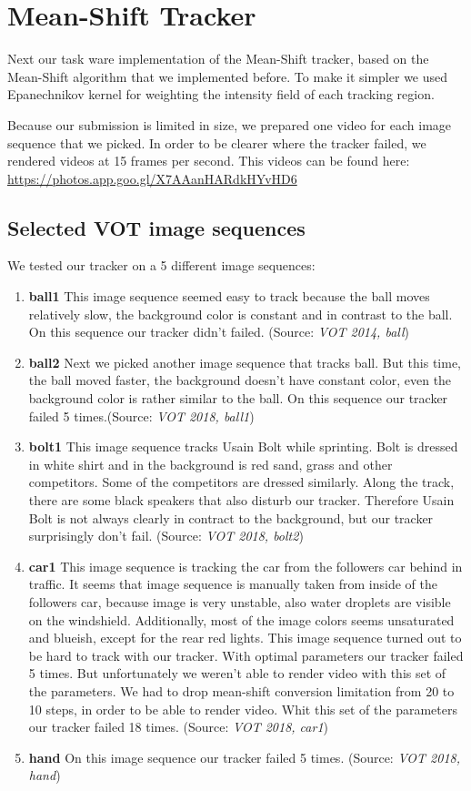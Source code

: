 \documentclass[runningheads]{llncs}
\begin{document}
\newpage
\section{Mean-Shift Tracker}

Next our task ware implementation of the Mean-Shift tracker, based on the Mean-Shift algorithm that we implemented before. To make it simpler we used Epanechnikov kernel for weighting the intensity field of each tracking region.

Because our submission is limited in size, we prepared one video for each image sequence that we picked. In order to be clearer where the tracker failed, we rendered videos at 15 frames per second. This videos can be found here: \url{https://photos.app.goo.gl/X7AAanHARdkHYvHD6}

\subsection{Selected VOT image sequences}

We tested our tracker on a 5 different image sequences:
\begin{enumerate}
\item \textbf{ball1} This image sequence seemed easy to track because the ball moves relatively slow, the background color is constant and in contrast to the ball. On this sequence our tracker didn't failed. (Source: \textit{VOT 2014, ball})
\item \textbf{ball2} Next we picked another image sequence that tracks ball. But this time, the ball moved faster, the background doesn't have constant color, even the background color is rather similar to the ball. On this sequence our tracker failed 5 times.(Source: \textit{VOT 2018, ball1})
\item \textbf{bolt1} This image sequence tracks Usain Bolt while sprinting. Bolt is dressed in white shirt and in the background is red sand, grass and other competitors. Some of the competitors are dressed similarly. Along the track, there are some black speakers that also disturb our tracker. Therefore Usain Bolt is not always clearly in contract to the background, but our tracker surprisingly don't fail. (Source: \textit{VOT 2018, bolt2})
\item \textbf{car1} This image sequence is tracking the car from the followers car behind in traffic. It seems that image sequence is manually taken from inside of the followers car, because image is very unstable, also water droplets are visible on the windshield. Additionally, most of the image colors seems unsaturated and blueish, except for the rear red lights. This image sequence turned out to be hard to track with our tracker. With optimal parameters our tracker failed 5 times. But unfortunately we weren't able to render video with this set of the parameters. We had to drop mean-shift conversion limitation from 20 to 10 steps, in order to be able to render video. Whit this set of the parameters our tracker failed 18 times. (Source: \textit{VOT 2018, car1})
\item \textbf{hand} On this image sequence our tracker failed 5 times. (Source: \textit{VOT 2018, hand})
\end{enumerate}
\end{document}

